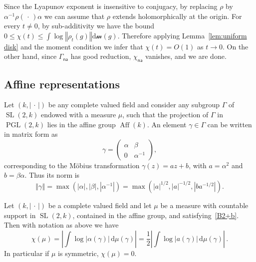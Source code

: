 \documentclass[AHL,Unicode,longabstracts]{cedram}
\DeclareMathOperator{\SL}{SL}
\DeclareMathOperator{\PGL}{PGL}
\DeclareMathOperator{\Aff}{Aff}
\newcommand{\sm}{\mathcal{m}}
\newcommand{\norm}[1]{\left\Vert#1\right\Vert}
\newcommand{\abs}[1]{\left\vert#1\right\vert}
\newcommand{\lrpar}[1]{\left(#1\right)}
\newcommand{\na}{\mathsf{na}}
\newcommand{\SLk}{\SL(2,k)}
\newcommand{\PGLk}{\PGL(2, k)}
\newcommand{\inv}{^{-1}}
\newcommand*{\dd}{\mathrm{d}}
\newcommand*{\dmu}{\dd \mu}
\newcommand*{\dsm}{\dd \sm}
\begin{document}
Since the Lyapunov exponent is insensitive to conjugacy, by replacing $\rho$ by\linebreak $\alpha\inv\rho({\,\cdot\,})\alpha$ we can assume that $\rho$ extends holomorphically at the origin. For every $t\neq 0$, by sub-additivity we have the bound $0\leq \chi(t) \leq \int \log \norm{\rho_t(g)} \dsm(g)$. Therefore applying Lemma~\ref{lem:uniform disk} and the moment condition we infer that $\chi(t) = O(1)$ as $t\to 0$. On the other hand, since $\Gamma_\na$ has good reduction, $\chi_\na$ vanishes, and we are done.

\subsection{Affine representations}

Let $({k},\abs{{\,\cdot\,}})$ be any complete valued field and consider any subgroup $\Gamma$ of $\SLk$ endowed with a measure $\mu$, such that the projection of $\Gamma$ in $\PGLk$ lies in the affine group $\Aff(k)$. An element $\gamma\in \Gamma$ can be written in matrix form as
\begin{equation}\label{eq:matrix}
\gamma = \lrpar{
\begin{matrix} \alpha & \beta \\ 0 &\alpha\inv
\end{matrix}},
\end{equation}
corresponding to the M\"obius transformation $\gamma(z) = az+b$, with $a= \alpha^2$ and $b = \beta\alpha$. Thus its norm is
\begin{equation}\label{eq:norm affine}
\norm{\gamma} =
\max\lrpar{ \abs{\alpha}, \abs{\beta}, \abs{\alpha\inv} }= \max\lrpar{\abs{a}^{1/2}, \abs{a}^{ -1/2}, \abs{ba^{-1/2}} }.
\end{equation}

\begin{prop}\label{prop:formula affine}
Let $(k,\abs{{\,\cdot\,}})$ be a complete valued field and let $\mu$ be a measure with countable support in $\SLk$, contained in the affine group, and satisfying~\eqref{B2+b}. Then with notation as above we have
\begin{equation}\label{eq:formula affine}
\chi(\mu) =
\abs{\int \log |\alpha (\gamma)| \, \dmu(\gamma)} = \frac12 \abs{\int \log |a(\gamma)|\, \dmu(\gamma)}\,.
\end{equation}
In particular if $\mu$ is symmetric, $\chi(\mu) = 0$.
\end{prop}
\end{document}
